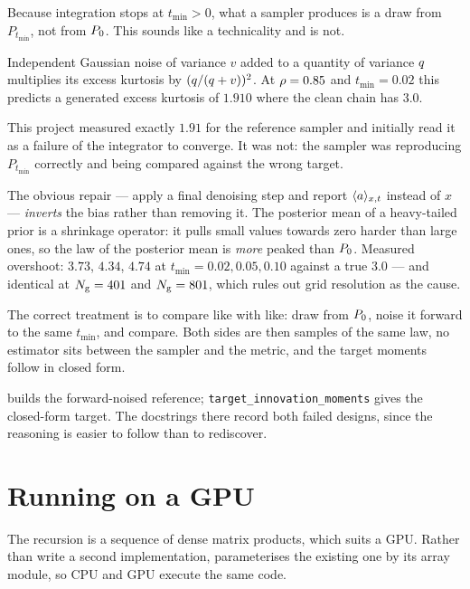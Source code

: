 Because integration stops at $t_{\min}>0$, what a sampler produces is a draw from
$P_{t_{\min}}$, not from $P_0$. This sounds like a technicality and is not.

Independent Gaussian noise of variance $v$ added to a quantity of variance $q$ multiplies
its excess kurtosis by $(q/(q+v))^2$. At $\rho=0.85$ and $t_{\min}=0.02$ this predicts
a generated excess kurtosis of $1.910$ where the clean chain has $3.0$.

\begin{pitfall}
This project measured exactly $1.91$ for the reference sampler and initially read it as a
failure of the integrator to converge. It was not: the sampler was reproducing
$P_{t_{\min}}$ correctly and being compared against the wrong target.

The obvious repair --- apply a final denoising step and report $\langle a \rangle_{x,t}$ instead of $x$ ---
\emph{inverts} the bias rather than removing it. The posterior mean of a heavy-tailed prior is
a shrinkage operator: it pulls small values towards zero harder than large ones, so the law of
the posterior mean is \emph{more} peaked than $P_0$. Measured overshoot: $3.73$, $4.34$, $4.74$
at $t_{\min}=0.02,0.05,0.10$ against a true $3.0$ --- and identical at $N_{\mathrm{g}}=401$ and
$N_{\mathrm{g}}=801$, which rules out grid resolution as the cause.

The correct treatment is to compare like with like: draw from $P_0$, noise it forward to the
same $t_{\min}$, and compare. Both sides are then samples of the same law, no estimator sits
between the sampler and the metric, and the target moments follow in closed form.
\end{pitfall}

\begin{codebox}
 builds the forward-noised
reference; \texttt{target\_innovation\_moments} gives the closed-form target. The docstrings
there record both failed designs, since the reasoning is easier to follow than to rediscover.
\end{codebox}

\section{Running on a GPU}

The recursion is a sequence of dense matrix products, which suits a GPU. Rather than write a
second implementation,  parameterises the existing one by its array
module, so CPU and GPU execute the same code.


